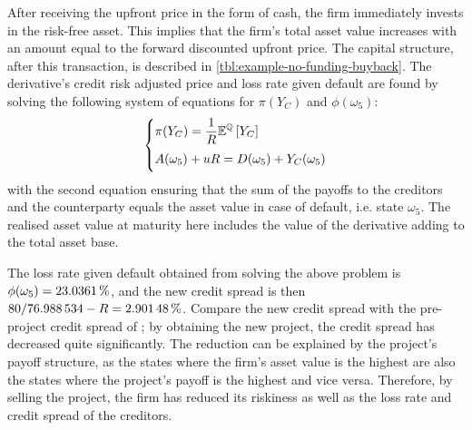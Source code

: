 \documentclass[main.tex]{subfiles}
\begin{document}
            After receiving the upfront price in the form of cash, the firm immediately invests in the risk-free asset. 
            This implies that the firm's total asset value increases 
            with an amount equal to the forward discounted upfront price. 
            The capital structure, after this transaction, is described in \cref{tbl:example-no-funding-buyback}.
            The derivative's credit risk adjusted price and loss rate given default are found
            by solving the following system of equations for $\pi(Y_C)$ and $\phi(\omega_{5})$:
            \begin{align}
                \left\{\begin{array}{@{}l@{}}
                    \displaystyle
                    \pi(Y_C) = \discountfactor\mathbb{E}^{\rnmeasure}\left[Y_{C}\right]
                    \\[1em]
                    \displaystyle
                    A(\omega_5) + uR = D(\omega_5) + Y_C(\omega_5)
                    \\[0.4em]
                \end{array}\right.
                \label{eqn:no-funding-buyback-default-state}
            \end{align}
            with the second equation ensuring that the 
            sum of the payoffs to the creditors and the counterparty
            equals the asset value in case of default, i.e. state $\omega_5$.
            The realised asset value at maturity here includes the value of the derivative adding to the total asset base.

            The loss rate given default obtained from solving the above problem is 
            $\phi(\omega_{5}) = \pct{0.230361}$, 
            and the new credit spread is then 
            $\num{80}/\num{76.988534} - \grossrfrate = \pct{0.0290148}$.
            Compare the new credit spread with the pre-project credit spread of ;
            by obtaining the new project, the credit spread has decreased quite significantly.
            The reduction can be explained by the project's payoff structure,
            as the states where the firm's asset value is the highest are
            also the states where the project's payoff is the highest and vice versa. 
            Therefore, by selling the project, the firm has reduced its riskiness
            as well as the loss rate and credit spread of the creditors.
\end{document}
